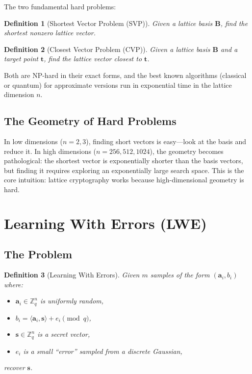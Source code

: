 \documentclass[11pt,a4paper]{article}
\newtheorem{definition}{Definition}
\begin{document}
The two fundamental hard problems:

\begin{definition}[Shortest Vector Problem (SVP)]
Given a lattice basis $\mathbf{B}$, find the shortest nonzero lattice vector.
\end{definition}

\begin{definition}[Closest Vector Problem (CVP)]
Given a lattice basis $\mathbf{B}$ and a target point $\mathbf{t}$, find the lattice
vector closest to $\mathbf{t}$.
\end{definition}

Both are NP-hard in their exact forms, and the best known algorithms (classical or
quantum) for approximate versions run in exponential time in the lattice dimension $n$.

\subsection{The Geometry of Hard Problems}

In low dimensions ($n = 2, 3$), finding short vectors is easy---look at the basis and
reduce it. In high dimensions ($n = 256, 512, 1024$), the geometry becomes pathological:
the shortest vector is exponentially shorter than the basis vectors, but finding it
requires exploring an exponentially large search space. This is the core intuition:
lattice cryptography works because high-dimensional geometry is hard.

\section{Learning With Errors (LWE)}

\subsection{The Problem}

\begin{definition}[Learning With Errors]
Given $m$ samples of the form $(\mathbf{a}_i, b_i)$ where:
\begin{itemize}[nosep]
  \item $\mathbf{a}_i \in \mathbb{Z}_q^n$ is uniformly random,
  \item $b_i = \langle \mathbf{a}_i, \mathbf{s} \rangle + e_i \pmod{q}$,
  \item $\mathbf{s} \in \mathbb{Z}_q^n$ is a secret vector,
  \item $e_i$ is a small ``error'' sampled from a discrete Gaussian,
\end{itemize}
recover $\mathbf{s}$.
\end{definition}
\end{document}
